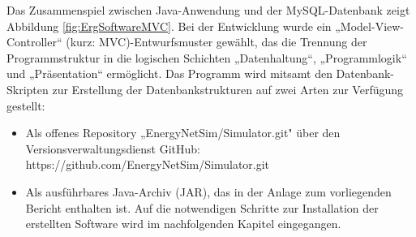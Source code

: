 \documentclass[12pt,titlepage]{article}
\begin{document}
Das Zusammenspiel zwischen Java-Anwendung und der MySQL-Datenbank zeigt 
Abbildung \ref{fig:ErgSoftwareMVC}. Bei der Entwicklung wurde ein „Model-View-Controller“ (kurz: MVC)-Entwurfsmuster gewählt, das die Trennung der Programmstruktur in die logischen Schichten „Datenhaltung“, „Programmlogik“ und „Präsentation“ ermöglicht. 
Das Programm wird mitsamt den Datenbank-Skripten zur Erstellung der Datenbankstrukturen auf zwei Arten zur Verfügung gestellt:
\begin{itemize}
\item Als offenes Repository „EnergyNetSim/Simulator.git" über den Versionsverwaltungsdienst GitHub: https://github.com/EnergyNetSim/Simulator.git
\item Als ausführbares Java-Archiv (JAR), das in der Anlage zum vorliegenden Bericht enthalten ist.
Auf die notwendigen Schritte zur Installation der erstellten Software wird im nachfolgenden Kapitel eingegangen.
\end{itemize}
\end{document}

